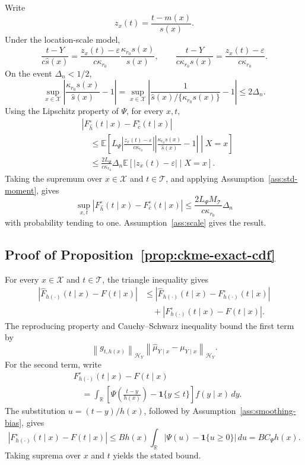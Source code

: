 \documentclass[11pt]{article}
\newcommand{\Xcal}{\mathcal X}
\newcommand{\Hcal}{\mathcal H}
\newcommand{\Tcal}{\mathcal T}
\newcommand{\E}{\mathbb E}
\newcommand{\R}{\mathbb R}
\newcommand{\ind}{\mathbf 1}
\newcommand{\norm}[1]{\left\lVert #1 \right\rVert}
\newcommand{\abs}[1]{\left\lvert #1 \right\rvert}
\begin{document}
Write
\[
  z_x(t)=\frac{t-m(x)}{s(x)}.
\]
Under the location-scale model,
\[
  \frac{t-Y}{c\widehat s(x)}
  =
  \frac{z_x(t)-\varepsilon}{c\kappa_{r_0}}
  \frac{\kappa_{r_0}s(x)}{\widehat s(x)},
  \qquad
  \frac{t-Y}{c\kappa_{r_0}s(x)}
  =
  \frac{z_x(t)-\varepsilon}{c\kappa_{r_0}}.
\]
On the event \(\Delta_n<1/2\),
\[
  \sup_{x\in\Xcal}
  \abs{\frac{\kappa_{r_0}s(x)}{\widehat s(x)}-1}
  =
  \sup_{x\in\Xcal}
  \abs{\frac{1}{\widehat s(x)/\{\kappa_{r_0}s(x)\}}-1}
  \le
  2\Delta_n .
\]
Using the Lipschitz property of \(\Psi\), for every \(x,t\),
\[
\begin{aligned}
  &\abs{F_{\widehat h}^{\circ}(t\mid x)-F_{\bar c}^\circ(t\mid x)} \\
  &\quad\le
  \E\left[
  L_\Psi
  \abs{\frac{z_x(t)-\varepsilon}{c\kappa_{r_0}}}
  \abs{\frac{\kappa_{r_0}s(x)}{\widehat s(x)}-1}
  \middle|X=x
  \right]  \\
  &\quad\le
  \frac{2L_\Psi}{c\kappa_{r_0}}\Delta_n
  \E\left[
  \abs{z_x(t)-\varepsilon}
  \middle|X=x
  \right].
\end{aligned}
\]
Taking the supremum over \(x\in\Xcal\) and \(t\in\Tcal\), and applying Assumption~\ref{ass:std-moment}, gives
\[
  \sup_{x,t}
  \abs{F_{\widehat h}^{\circ}(t\mid x)-F_{\bar c}^\circ(t\mid x)}
  \le
  \frac{2L_\Psi M_{\Tcal}}{c\kappa_{r_0}}\Delta_n
\]
with probability tending to one. Assumption~\ref{ass:scale} gives the result.

\subsection{Proof of Proposition~\ref{prop:ckme-exact-cdf}}

For every \(x\in\Xcal\) and \(t\in\Tcal\), the triangle inequality gives
\[
\begin{aligned}
  \abs{\widehat F_{h(\cdot)}(t\mid x)-F(t\mid x)}
  &\le
  \abs{\widehat F_{h(\cdot)}(t\mid x)
  -F_{h(\cdot)}^\circ(t\mid x)}\\
  &\quad+
  \abs{F_{h(\cdot)}^\circ(t\mid x)-F(t\mid x)}.
\end{aligned}
\]
The reproducing property and Cauchy--Schwarz inequality bound the first term by
\[
  \norm{g_{t,h(x)}}_{\Hcal_Y}
  \norm{\widehat\mu_{Y\mid x}-\mu_{Y\mid x}}_{\Hcal_Y}.
\]
For the second term, write
\[
\begin{aligned}
  &F_{h(\cdot)}^\circ(t\mid x)-F(t\mid x)\\
  &\quad=
  \int_{\R}
  \left[
  \Psi\!\left(\frac{t-y}{h(x)}\right)-\ind\{y\le t\}
  \right]
  f(y\mid x)\,dy.
\end{aligned}
\]
The substitution \(u=(t-y)/h(x)\), followed by
Assumption~\ref{ass:smoothing-bias}, gives
\[
  \abs{F_{h(\cdot)}^\circ(t\mid x)-F(t\mid x)}
  \le
  B h(x)
  \int_{\R}\abs{\Psi(u)-\ind\{u\ge0\}}\,du
  =
  B C_\Psi h(x).
\]
Taking suprema over \(x\) and \(t\) yields the stated bound.
\end{document}
